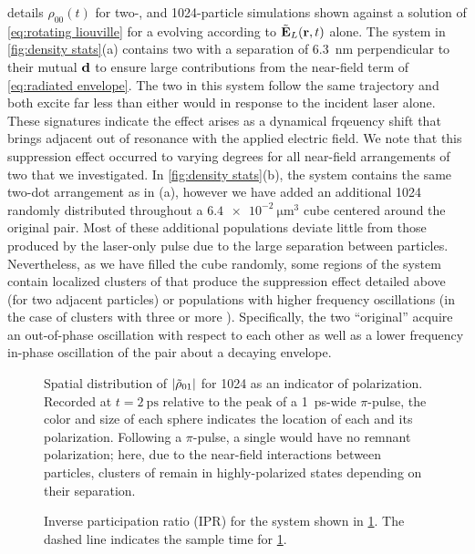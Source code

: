  details $\rho_{00}(t)$ for two-, and 1024-particle simulations shown against a solution of \cref{eq:rotating liouville} for a \qd{} evolving according to $\tilde{\vb{E}}_L(\vb{r}, t)$ alone.
The system in \cref{fig:density stats}(a) contains two \qds{} with a separation of \SI{6.3}{\nano\meter} perpendicular to their mutual $\vb{d}$ to ensure large contributions from the near-field term of \cref{eq:radiated envelope}.
The two \qds{} in this system follow the same trajectory and both excite far less than either would in response to the incident laser alone.
These signatures indicate the effect arises as a dynamical frqeuency shift that brings adjacent \qds{} out of resonance with the applied electric field.
We note that this suppression effect occurred to varying degrees for all near-field arrangements of two \qds{} that we investigated.
In \cref{fig:density stats}(b), the system contains the same two-dot arrangement as in (a), however we have added an additional 1024 \qds{} randomly distributed throughout a $\SI{6.4e-2}{\micro\meter\cubed}$ cube centered around the original pair.
Most of these additional \qd{} populations deviate little from those produced by the laser-only pulse due to the large separation between particles.
Nevertheless, as we have filled the cube randomly, some regions of the system contain localized clusters of \qds{} that produce the suppression effect detailed above (for two adjacent particles) or populations with higher frequency oscillations (in the case of clusters with three or more \qds{}).
Specifically, the two ``original'' \qds{} acquire an out-of-phase oscillation with respect to each other as well as a lower frequency in-phase oscillation of the pair about a decaying envelope.


\begin{figure}
  \centering
  
  \caption{\label{fig:nearfield box}Spatial distribution of $\abs{\tilde{\rho}_{01}}$ for 1024 \qds{} as an indicator of polarization.
    Recorded at $t = \SI{2}{\pico\second}$ relative to the peak of a \SI{1}{\pico\second}-wide $\pi$-pulse, the color and size of each sphere indicates the location of each \qd{} and its polarization.
    Following a $\pi$-pulse, a single \qd{} would have no remnant polarization; here, due to the near-field interactions between particles, clusters of \qds{} remain in highly-polarized states depending on their separation.
  }
\end{figure}

\begin{figure}
  
  \caption{\label{fig:ipr}Inverse participation ratio (IPR) for the system shown in \cref{fig:nearfield box}. The dashed line indicates the sample time for \cref{fig:nearfield box}.}
\end{figure}

